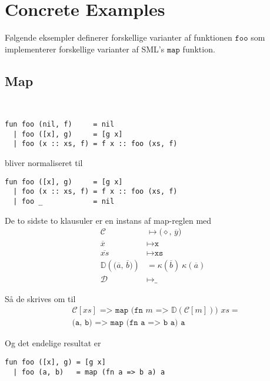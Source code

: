 \chapter{Concrete Examples}


Følgende eksempler definerer forskellige varianter af funktionen $\texttt{foo}$
som implementerer forskellige varianter af SML's $\texttt{map}$ funktion.

\section{Map}

\begin{example}\
\begin{verbatim}
fun foo (nil, f)     = nil
  | foo ([x], g)     = [g x]
  | foo (x :: xs, f) = f x :: foo (xs, f)
\end{verbatim}

bliver normaliseret til

\begin{verbatim}
fun foo ([x], g)     = [g x]
  | foo (x :: xs, f) = f x :: foo (xs, f)
  | foo _            = nil
\end{verbatim}

De to sidste to klausuler er en instans af \textsf{map}-reglen med
\begin{align}
\mathcal{C} &\mapsto \texttt{($\diamond$, $\overline{y}$)}\\
\overline{x} &\mapsto \texttt{x}\\
\overline{xs} &\mapsto \texttt{xs}\\
\mathbb{D}(\texttt{($\overline{a}$, $\overline{b}$)}) &= \kappa(\overline{b})\
\kappa(\overline{a})\\
\mathcal{D} &\mapsto \texttt{\_}
\end{align}

Så de skrives om til
  \begin{align}
    &\texttt{$\mathcal{C}[xs]$ => map (fn $m$ =>
      $\mathbb{D}(\mathcal{C}[m])$) $xs$} =\\
    &\texttt{(a, b) => map (fn a => b a) a}
  \end{align}

Og det endelige resultat er

\begin{verbatim}
fun foo ([x], g) = [g x]
  | foo (a, b)   = map (fn a => b a) a
\end{verbatim}

\end{example}

